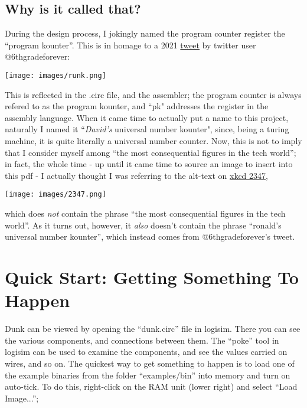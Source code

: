 \documentclass{article}
\begin{document}
\subsection{Why is it called that?}

During the design process, I jokingly named the program counter register the ``program kounter''. This is in homage to a 2021 \href{https://x.com/6thgrade4ever/status/1433519577892327424}{tweet} by twitter user @6thgradeforever:

    \begin{center}\texttt{[image: images/runk.png]}\end{center}

This is reflected in the .circ file, and the assembler; the program counter is always refered to as the program kounter, and ``pk" addresses the register in the assembly language. When it came time to actually put a name to this project, naturally I named it ``\textit{David's} universal number kounter", since, being a turing machine, it is quite literally a universal number counter. Now, this is not to imply that I consider myself among ``the most consequential figures in the tech world''; in fact, the whole time - up until it came time to source an image to insert into this pdf - 	I actually thought I was referring to the alt-text on \href{https://xkcd.com/2347/}{xkcd 2347},

    \begin{center}\texttt{[image: images/2347.png]}\end{center}

which does \textit{not} contain the phrase ``the most consequential figures in the tech world''. As it turns out, however, it \textit{also} doesn't contain the phrase ``ronald's universal number kounter'', which instead comes from @6thgradeforever's tweet.

\section{Quick Start: Getting Something To Happen}

Dunk can be viewed by opening the ``dunk.circ'' file in logisim. There you can see the various components, and connections between them. The ``poke'' tool in logisim can be used to examine the components, and see the values carried on wires, and so on. The quickest way to get something to happen is to load one of the example binaries from the folder ``examples/bin'' into memory and turn on auto-tick. To do this, right-click on the RAM unit (lower right) and select ``Load Image...'';
\end{document}
